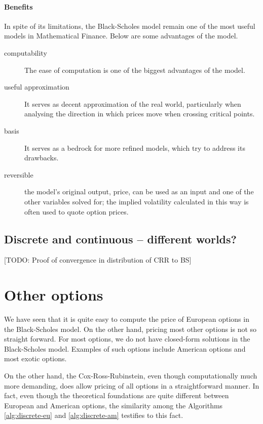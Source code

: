 \paragraph{Benefits}
In spite of its limitations, the Black-Scholes model remain one of the most useful models in Mathematical Finance. Below are some advantages of the model.
\begin{description}
	\item[computability] The ease of computation is one of the biggest advantages of the model.
	\item[useful approximation] It serves as decent approximation of the real world, particularly when analysing the direction in which prices move when crossing critical points.
	\item[basis] It serves as a bedrock for more refined models, which try to address its drawbacks.
	\item[reversible] the model's original output, price, can be used as an input and one of the other variables solved for; the implied volatility calculated in this way is often used to quote option prices.
\end{description}



\subsection{Discrete and continuous -- different worlds?}
[TODO: Proof of convergence in distribution of CRR to BS]



\section{Other options}

We have seen that it is quite easy to compute the price of European options in the Black-Scholes model. On the other hand, pricing most other options is not so straight forward. For most options, we do not have closed-form solutions in the Black-Scholes model. Examples of such options include American options and most exotic options.

On the other hand, the Cox-Ross-Rubinstein, even though computationally much more demanding, does allow pricing of all options in a straightforward manner. In fact, even though the theoretical foundations are quite different between European and American options, the similarity among the Algorithms \ref{alg:discrete-eu} and \ref{alg:discrete-am} testifies to this fact.

